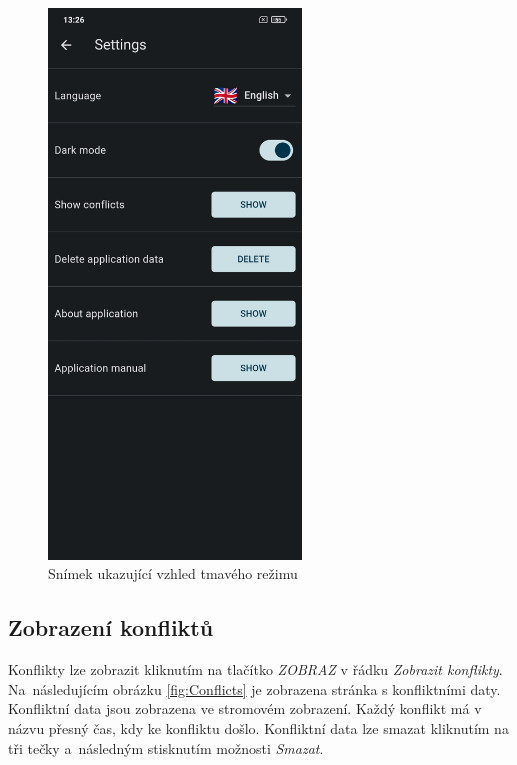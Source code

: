 \documentclass[czech, bc, kiv, he, iso690numb]{fasthesis}
\begin{document}
\begin{figure}[h!]
  \centering
  \includegraphics[width=0.6\textwidth]{img/BP-Runt/UserManual/DarkMode.jpg}
  \caption{Snímek ukazující vzhled tmavého režimu}
  \label{fig:DarkMode}
\end{figure}

\subsection{Zobrazení konfliktů}

Konflikty lze zobrazit kliknutím na tlačítko \textit{ZOBRAZ} v řádku \textit{Zobrazit konflikty}. Na~následujícím obrázku \ref{fig:Conflicts} je zobrazena stránka s konfliktními daty. Konfliktní data jsou zobrazena ve stromovém zobrazení. Každý konflikt má v názvu přesný čas, kdy ke konfliktu došlo. Konfliktní data lze smazat kliknutím na tři tečky a~následným stisknutím možnosti \textit{Smazat}.
\end{document}
